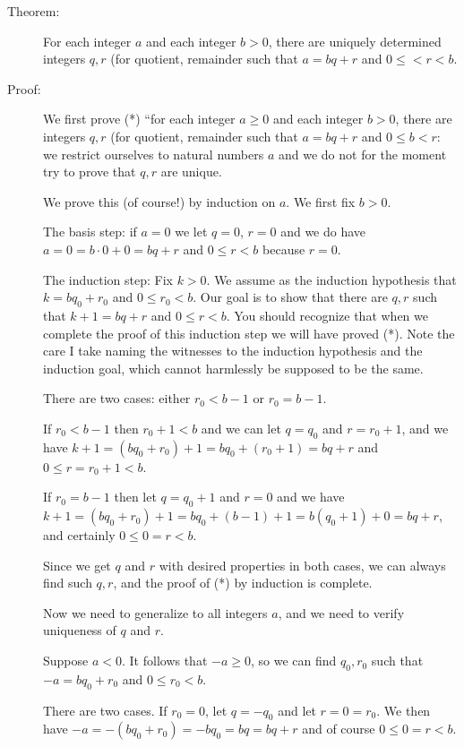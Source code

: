 \documentclass[12pt]{article}
\begin{document}
\begin{description}

\item[Theorem:]  For each integer $a$ and each integer $b >0$, there are uniquely determined integers $q,r$ (for quotient, remainder such that $a=bq+r$ and $0 \leq <r<b$.

\item[Proof:]  We first prove (*) ``for each integer $a\geq  0$ and each integer $b >0$, there are integers $q,r$ (for quotient, remainder such that $a=bq+r$ and $0 \leq b <r$: we restrict ourselves to natural numbers $a$ and we do not for the moment try to prove that $q,r$ are unique.

We prove this (of course!) by induction on $a$.  We first fix $b>0$.

The basis step:  if $a=0$ we let $q=0$, $r=0$ and we do have $a=0=b\cdot 0 +0 = bq+r$ and $0 \leq r <b$ because $r=0$.

The induction step:  Fix $k>0$.  We assume as the induction hypothesis that $k=bq_0 + r_0$ and $0 \leq r_0 < b$.
Our goal is to show that there are $q,r$ such that $k+1=bq+r$ and $0\leq r <b$.  You should recognize that when we complete the proof of this induction step we will have proved (*).  Note the care I take naming the witnesses to the induction hypothesis and the induction goal, which cannot harmlessly be supposed to be the same.

There are two cases:  either $r_0 <b-1$ or $r_0 = b-1$.

If $r_0<b-1$ then $r_0+1<b$ and we can let $q=q_0$ and $r=r_0+1$, and we have $k+1 = (bq_0+r_0)+1 =
bq_0+(r_0+1) = bq+r$ and $0\leq r=r_0+1<b$.

If $r_0=b-1$ then let $q=q_0+1$ and $r=0$ and we have $k+1 = (bq_0+r_0)+1 = bq_0 +(b-1) +1 = b(q_0+1)+0=bq+r$,
and certainly $0 \leq 0=r<b$.

Since we get $q$ and $r$ with desired properties in both cases, we can always find such $q,r$, and the proof of (*) by induction is complete.

Now we need to generalize to all integers $a$, and we need to verify uniqueness of $q$ and $r$.

Suppose $a<0$.  It follows that $-a \geq 0$, so we can find $q_0,r_0$ such that $-a = bq_0+r_0$ and $0 \leq r_0 <b$.

There are two cases.  If $r_0 =0$, let $q=-q_0$ and let $r=0=r_0$.  We then have $-a = -(bq_0+r_0) = -bq_0 = bq = bq+r$
and of course $0 \leq 0 = r <b$.


\end{description}
\end{document}

